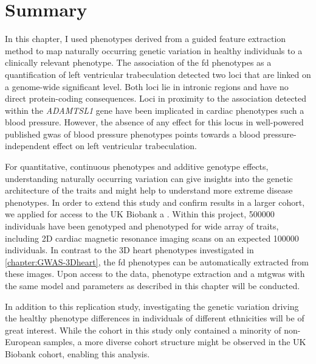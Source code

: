 \section{Summary}
In this chapter, I used phenotypes derived from a guided feature extraction method to map naturally occurring genetic variation in healthy individuals to a clinically relevant phenotype. The association of the \gls{fd} phenotypes as a quantification of left ventricular trabeculation detected two loci that are linked on a genome-wide significant level. Both loci lie in intronic regions and have no direct protein-coding consequences. Loci in proximity to the association detected within the \textit{ADAMTSL1} gene have been implicated in cardiac phenotypes such a blood pressure. However, the absence of any effect for this locus in well-powered published \gls{gwas} of blood pressure phenotypes points towards a blood pressure-independent effect on left ventricular trabeculation.

For quantitative, continuous phenotypes and additive genotype effects, understanding naturally occurring variation can give insights into the genetic architecture of the traits and might help to understand more extreme disease phenotypes. In order to extend this study and confirm results in a larger cohort, we applied for access to the UK Biobank a  \citep{Sudlow2015}. Within this project, \num{500000} individuals have been genotyped and phenotyped for wide array of traits, including 2D cardiac magnetic resonance imaging scans on an expected \num{100000} individuals. In contrast to the 3D heart phenotypes investigated in \cref{chapter:GWAS-3Dheart}, the \gls{fd} phenotypes can be automatically extracted from these images. Upon access to the data,  phenotype extraction and a \gls{mtgwas} with the same model and parameters as described in this chapter will be conducted. 

In addition to this replication study, investigating the genetic variation driving the healthy phenotype differences in individuals of different ethnicities \citep{Kawel2012,Captur2014} will be of great interest. While the cohort in this study only contained a minority of non-European samples, a more diverse cohort structure might be observed in the UK Biobank cohort, enabling this analysis. 
